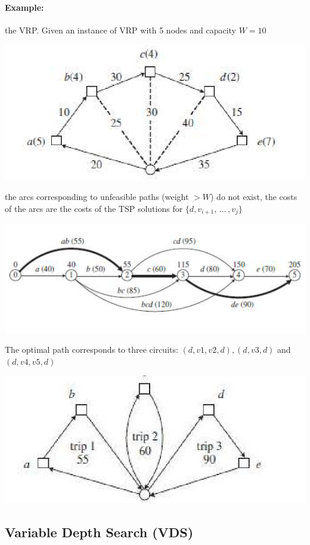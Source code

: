 \paragraph{Example:} the VRP. Given an instance of VRP with 5 nodes and capacity $W = 10$
\begin{center}
	\includegraphics[width=0.6\columnwidth]{img/VRP2}
\end{center}
the arcs corresponding to unfeasible paths (weight $> W$) do not exist, the costs of the arcs are the costs of the TSP solutions for $\{d, v_{i+1}, \, ... \, , v_j \}$
\begin{center}
	\includegraphics[width=0.6\columnwidth]{img/VRP3}
\end{center}
The optimal path corresponds to three circuits: $(d, v1, v2, d), (d, v3, d)$ and $(d, v4, v5, d)$
\begin{center}
	\includegraphics[width=0.6\columnwidth]{img/VRP4}
\end{center}

\newpage

\subsection{Variable Depth Search (VDS)}

